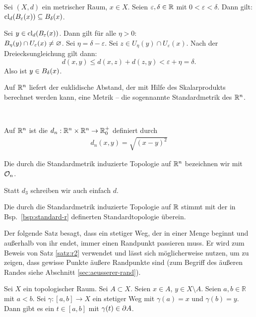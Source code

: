     \begin{satz}\label{satz:ball}
    Sei $(X,d)$ ein metrischer Raum, $x \in X$. Seien $\varepsilon, \delta \in \mathbb{R}$ mit $0 < \varepsilon< \delta$. Dann gilt: $\text{cl}_d(B_\varepsilon(x)) \subseteq B_\delta(x)$.
    \end{satz}
    \begin{bew}
    Sei $y \in \text{cl}_d(B_\varepsilon(x))$. Dann gilt für alle $\eta > 0$:\\ $B_\eta(y) \cap U_\varepsilon(x) \neq \varnothing$. Sei $\eta = \delta - \varepsilon$. Sei $z \in U_\eta(y) \cap U_\varepsilon(x)$. Nach der Dreiecksungleichung gilt dann:
    $$d(x,y) \leq d(x,z) + d(z,y) < \varepsilon + \eta = \delta.$$
    Also ist $y \in B_\delta(x)$.
    \end{bew}


    Auf
    $\mathbb{R}^n$ liefert der euklidische Abstand, der mit Hilfe des Skalarprodukts berechnet werden kann, eine Metrik -- die sogennannte Standardmetrik des $\mathbb{R}^n$.
    \begin{dfn}\label{def:standardmetrik}\ \vspace{8pt}

        \noindent
        Auf $\mathbb{R}^n$ ist die  $d_n : \mathbb{R}^n \times \mathbb{R}^n \rightarrow \mathbb{R}_0^+$ definiert durch
        \begin{align*}
            d_n(x,y) = \sqrt{(x-y)^2}
        \end{align*}
        
        \noindent
        Die durch die Standardmetrik induzierte Topologie auf $\mathbb{R}^n$ bezeichnen wir mit $\mathcal{O}_n$.
        
    \end{dfn}

    \begin{konv}\label{konv:d3}
        Statt $d_3$ schreiben wir auch einfach $d$.	
    \end{konv}
    
    \begin{bem}
        Die durch die Standardmetrik induzierte Topologie auf $\mathbb{R}$ stimmt mit der in Bsp.~\ref{bsp:standard-r} definerten Standardtopologie überein.
    \end{bem}


    Der folgende Satz besagt, dass ein stetiger Weg, der in einer Menge beginnt und außerhalb von ihr endet, immer einen Randpunkt passieren muss. Er wird zum Beweis von Satz \ref{satz:r2} verwendet und lässt sich möglicherweise nutzen, um zu zeigen, dass gewisse Punkte äußere Randpunkte sind (zum Begriff des äußeren Randes siehe Abschnitt \ref{sec:aeusserer-rand}).
    \begin{satz}\label{satz:weg} %
        Sei $X$ ein topologischer Raum. Sei $A \subset X$. Seien $x \in A$, $y \in X \setminus A$. Seien $a,b \in \mathbb{R}$ mit $a < b$. Sei $\gamma : [a,b] \to X$ ein stetiger Weg mit $\gamma(a) = x$ und $\gamma(b) = y$. Dann gibt es ein $t \in [a,b]$ mit $\gamma(t) \in \partial A$.
    \end{satz}
    
